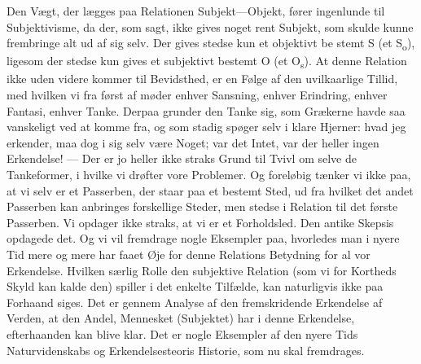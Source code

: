 \documentclass[12pt]{article}
\newcommand{\opage}[1]{\marginnote{\footnotesize\textit{[#1]}}}
\begin{document}
Den Vægt, der lægges paa Relationen Subjekt---Objekt, fører ingenlunde
til Subjektivisme, da der, som sagt, ikke gives noget rent Subjekt, som
skulde kunne frembringe alt ud af sig selv. Der gives stedse kun et
objektivt be%
\opage{62}%
\setcounter{footnote}{0}
stemt S (et S\textsubscript{o}), ligesom der stedse kun gives et subjektivt
bestemt O (et O\textsubscript{s}). At denne Relation ikke uden videre kommer
til Bevidsthed, er en Følge af den uvilkaarlige Tillid, med hvilken vi fra
først af møder enhver Sansning, enhver Erindring, enhver Fantasi, enhver
Tanke. Derpaa grunder den Tanke sig, som Grækerne havde saa vanskeligt ved at
komme fra, og som stadig spøger selv i klare Hjerner: hvad jeg erkender, maa
dog i sig selv være Noget; var det Intet, var der heller ingen Erkendelse!
--- Der er jo heller ikke straks Grund til Tvivl om selve de Tankeformer, i
hvilke vi drøfter vore Problemer. Og foreløbig tænker vi ikke paa, at vi selv
er et Passerben, der staar paa et bestemt Sted, ud fra hvilket det andet
Passerben kan anbringes forskellige Steder, men stedse i Relation til det
første Passerben. Vi opdager ikke straks, at vi er et Forholdsled. Den antike
Skepsis opdagede det. Og vi vil fremdrage nogle Eksempler paa, hvorledes man
i nyere Tid mere og mere har faaet Øje for denne Relations Betydning for al
vor Erkendelse. Hvilken særlig Rolle den subjektive Relation (som vi for
Kortheds Skyld kan kalde den) spiller i det enkelte Tilfælde, kan naturligvis
ikke paa Forhaand siges. Det er gennem Analyse af den fremskridende
Erkendelse af Verden, at den Andel, Mennesket (Subjektet) har i denne
Erkendelse, efterhaanden kan blive klar. Det er nogle Eksempler af den nyere
Tids Naturvidenskabs og Erkendelsesteoris Historie, som nu skal fremdrages.

\end{document}
